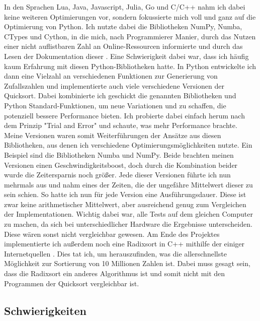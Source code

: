 \documentclass[11pt,a4paper]{article}
\begin{document}
In den Sprachen Lua, Java, Javascript, Julia, Go und C/C++ nahm ich dabei keine weiteren Optimierungen vor,
sondern fokussierte mich voll und ganz auf die Optimierung von Python.
Ich nutzte dabei die Bibliotheken NumPy, Numba, CTypes und Cython, in die mich, nach Programmierer
Manier, durch das Nutzen einer nicht auflistbaren Zahl an Online-Ressourcen informierte und
durch das Lesen der Dokumentation dieser \cite{cythondocs} \cite{cythondocsnumpy} \cite{cythonctypes}.
Eine Schwierigkeit dabei war, dass ich häufig kaum Erfahrung mit diesen Python-Bibliotheken hatte.
In Python entwickelte ich dann eine Vielzahl an verschiedenen Funktionen zur Generierung von Zufallszahlen
und implementierte auch viele verschiedene Versionen der Quicksort. Dabei kombinierte ich geschickt die
genannten Bibliotheken und Python Standard-Funktionen, um neue Variationen und zu schaffen,
die potenziell bessere Performance bieten.
Ich probierte dabei einfach herum nach dem Prinzip "Trial and Error" und schaute, was mehr Performance brachte.
Meine Versionen waren somit Weiterführungen der Ansätze aus diesen Bibliotheken, aus denen ich
verschiedene Optimierungsmöglichkeiten nutzte.
Ein Beispiel sind die Bibliotheken Numba und NumPy. Beide brachten meinen Versionen einen
Geschwindigkeitsboost, doch durch die Kombination beider wurde die Zeitersparnis noch größer.
Jede dieser Versionen führte ich nun mehrmals aus und nahm eines der Zeiten, die der ungefähre
Mittelwert dieser zu sein schien. So hatte ich nun für jede Version eine Ausführungsdauer.
Diese ist zwar keine arithmetischer Mittelwert, aber ausreichend genug zum Vergleichen
der Implementationen. Wichtig dabei war, alle Tests auf dem gleichen Computer zu machen,
da sich bei unterschiedlicher Hardware
die Ergebnisse unterscheiden. Diese wären sonst nicht vergleichbar gewesen.
Am Ende des Projektes implementierte ich außerdem noch eine Radixsort in C++ mithilfe der
einiger Internetquellen \cite{terdiman} \cite{michael} \cite{intelavxdocs} \cite{avxguide}.
Dies tat ich, um herauszufinden, was die allerschnellste Möglichkeit zur Sortierung von 10 Millionen
Zahlen ist. Dabei muss gesagt sein, dass die Radixsort ein anderes
Algorithmus ist und somit nicht mit den Programmen der Quicksort vergleichbar ist.

\subsection{Schwierigkeiten}
\end{document}
